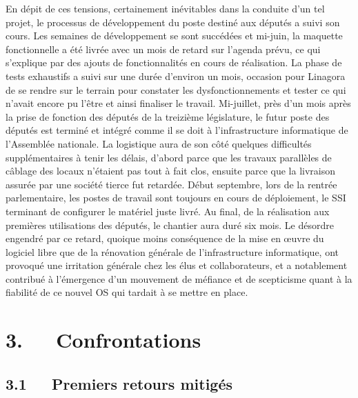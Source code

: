 \documentclass{FramateX}
\begin{document}
\begin{refsection}
En dépit de ces tensions, certainement inévitables dans la conduite d'un
tel projet, le processus de développement du poste destiné aux députés
a suivi son cours. Les semaines de développement se sont succédées et
mi-juin, la maquette fonctionnelle a été livrée avec un mois de retard
sur l'agenda prévu, ce qui s'explique par des ajouts de fonctionnalités
en cours de réalisation. La phase de tests exhaustifs a suivi sur une
durée d'environ un mois, occasion pour Linagora de se rendre sur le
terrain pour constater les dysfonctionnements et tester ce qui n'avait
encore pu l'être et ainsi finaliser le travail. Mi-juillet, près d'un
mois après la prise de fonction des députés de la treizième
législature, le futur poste des députés est terminé et intégré comme il
se doit à l'infrastructure informatique de l'Assemblée nationale. La
logistique aura de son côté quelques difficultés supplémentaires à
tenir les délais, d'abord parce que les travaux parallèles de câblage
des locaux n'étaient pas tout à fait clos, ensuite parce que la
livraison assurée par une société tierce fut retardée. Début septembre,
lors de la rentrée parlementaire, les postes de travail sont toujours
en cours de déploiement, le SSI terminant de configurer le matériel
juste livré. Au final, de la réalisation aux premières utilisations des
députés, le chantier aura duré six mois. Le désordre engendré par ce
retard, quoique moins conséquence de la mise en œuvre du logiciel libre
que de la rénovation générale de l'infrastructure informatique, ont
provoqué une irritation générale chez les élus et collaborateurs, et a
notablement contribué à l'émergence d'un mouvement de méfiance et de
scepticisme quant à la fiabilité de ce nouvel OS qui tardait à se
mettre en place.

\section*{3.~~~Confrontations}
{}

\subsection*{3.1~~~Premiers retours mitigés}
{}


\end{refsection}
\end{document}
